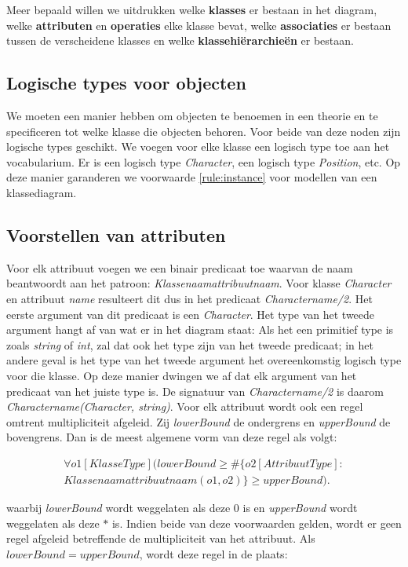 Meer bepaald willen we uitdrukken welke \textbf{klasses} er bestaan in het diagram, welke \textbf{attributen} en \textbf{operaties} elke klasse bevat, welke \textbf{associaties} er bestaan tussen de verscheidene klasses en welke \textbf{klassehi\"erarchie\"en} er bestaan.

\subsection{Logische types voor objecten}
We moeten een manier hebben om objecten te benoemen in een theorie en te specificeren tot welke klasse die objecten behoren. Voor beide van deze noden zijn logische types geschikt. We voegen voor elke klasse een logisch type toe aan het vocabularium. Er is een logisch type \textit{Character}, een logisch type \textit{Position}, etc. Op deze manier garanderen we voorwaarde \ref{rule:instance} voor modellen van een klassediagram.

\subsection{Voorstellen van attributen}
Voor elk attribuut voegen we een binair predicaat toe waarvan de naam beantwoordt aan het patroon: \textit{Klassenaamattribuutnaam}. Voor klasse \textit{Character} en attribuut \textit{name} resulteert dit dus in het predicaat \textit{Charactername/2}. Het eerste argument van dit predicaat is een \textit{Character}. Het type van het tweede argument hangt af van wat er in het diagram staat: Als het een primitief type is zoals \textit{string} of \textit{int}, zal dat ook het type zijn van het tweede predicaat; in het andere geval is het type van het tweede argument het overeenkomstig logisch type voor die klasse. Op deze manier dwingen we af dat elk argument van het predicaat van het juiste type is.
De signatuur van \textit{Charactername/2} is daarom \textit{Charactername(Character, string)}.
Voor elk attribuut wordt ook een regel omtrent multipliciteit afgeleid. Zij \textit{lowerBound} de ondergrens en \textit{upperBound} de bovengrens. Dan is de meest algemene vorm van deze regel als volgt:
	
\begin{align*}
	\forall{o1}[KlasseType](lowerBound \geq \#\{o2 [AttribuutType] : \\ Klassenaamattribuutnaam(o1,o2)\} \geq upperBound).
\end{align*}
	
waarbij \textit{lowerBound} wordt weggelaten als deze $0$ is en \textit{upperBound} wordt weggelaten als deze $*$ is. Indien beide van deze voorwaarden gelden, wordt er geen regel afgeleid betreffende de multipliciteit van het attribuut. Als $lowerBound = upperBound$, wordt deze regel in de plaats:
	
